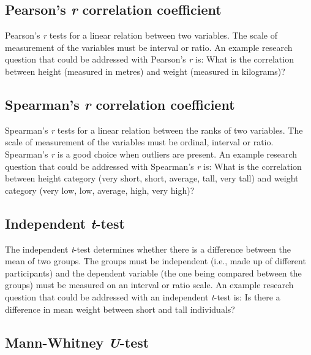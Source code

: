 \documentclass[
]{book}
\begin{document}
\hypertarget{pearsons-r-correlation-coefficient}{%
\subsection{\texorpdfstring{Pearson's \emph{r} correlation coefficient}{Pearson's r correlation coefficient}}\label{pearsons-r-correlation-coefficient}}

Pearson's \emph{r} tests for a linear relation between two variables. The scale of measurement of the variables must be interval or ratio. An example research question that could be addressed with Pearson's \emph{r} is: What is the correlation between height (measured in metres) and weight (measured in kilograms)?

\hypertarget{spearmans-r-correlation-coefficient}{%
\subsection{\texorpdfstring{Spearman's \emph{r} correlation coefficient}{Spearman's r correlation coefficient}}\label{spearmans-r-correlation-coefficient}}

Spearman's \emph{r} tests for a linear relation between the ranks of two variables. The scale of measurement of the variables must be ordinal, interval or ratio. Spearman's \emph{r} is a good choice when outliers are present. An example research question that could be addressed with Spearman's \emph{r} is: What is the correlation between height category (very short, short, average, tall, very tall) and weight category (very low, low, average, high, very high)?

\hypertarget{independent-t-test}{%
\subsection{\texorpdfstring{Independent \emph{t}-test}{Independent t-test}}\label{independent-t-test}}

The independent \emph{t}-test determines whether there is a difference between the mean of two groups. The groups must be independent (i.e., made up of different participants) and the dependent variable (the one being compared between the groups) must be measured on an interval or ratio scale. An example research question that could be addressed with an independent \emph{t}-test is: Is there a difference in mean weight between short and tall individuals?

\hypertarget{mann-whitney-u-test}{%
\subsection{\texorpdfstring{Mann-Whitney \emph{U}-test}{Mann-Whitney U-test}}\label{mann-whitney-u-test}}
\end{document}
